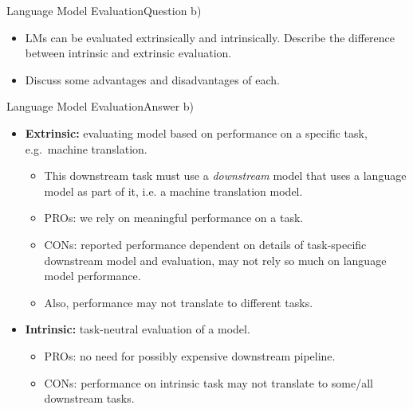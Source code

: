 \documentclass[t]{beamer}
\begin{document}
\begin{frame}{Language Model Evaluation}{Question b)}
    \begin{itemize}
        \item LMs can be evaluated extrinsically and intrinsically.
              Describe the difference between intrinsic and extrinsic
              evaluation.
        \item Discuss some advantages and disadvantages of each.
    \end{itemize}
\end{frame}

\begin{frame}{Language Model Evaluation}{Answer b)}
    \begin{itemize}
        \item \textbf{Extrinsic:} evaluating model based on performance on a
              specific task, e.g.\ machine translation.
              \begin{itemize}
                  \item This downstream task must use a \emph{downstream} model
                        that uses a language model as part of it, i.e. a machine
                        translation model.
                  \item PROs: we rely on meaningful performance on a task.
                  \item CONs: reported performance dependent on details of
                        task-specific downstream model and evaluation, may not
                        rely so much on language  model performance.
                  \item Also, performance may not translate to different tasks.
              \end{itemize}
        \item \textbf{Intrinsic:} task-neutral evaluation of a model.
              \begin{itemize}
                  \item PROs: no need for possibly expensive downstream
                        pipeline.
                  \item CONs: performance on intrinsic task may not translate to
                        some/all downstream tasks.
              \end{itemize}
    \end{itemize}
\end{frame}
\end{document}
